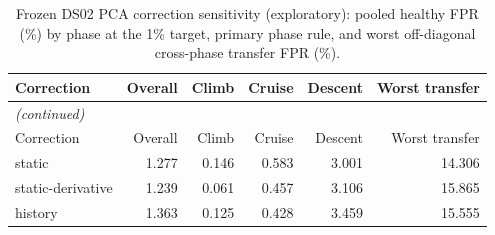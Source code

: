 \begin{footnotesize}
\begin{longtable}{lrrrrr}
\caption{Frozen DS02 PCA correction sensitivity (exploratory): pooled healthy FPR (\%) by phase at the 1\% target, primary phase rule, and worst off-diagonal cross-phase transfer FPR (\%).}\label{tab:s2_correction}\\
\toprule
Correction & Overall & Climb & Cruise & Descent & Worst transfer \\
\midrule
\endfirsthead
\multicolumn{6}{l}{\emph{(continued)}}\\
\toprule
Correction & Overall & Climb & Cruise & Descent & Worst transfer \\
\midrule
\endhead
\bottomrule
\endfoot
static & 1.277 & 0.146 & 0.583 & 3.001 & 14.306 \\
\midrule
static-derivative & 1.239 & 0.061 & 0.457 & 3.106 & 15.865 \\
\midrule
history & 1.363 & 0.125 & 0.428 & 3.459 & 15.555 \\
\end{longtable}
\end{footnotesize}
